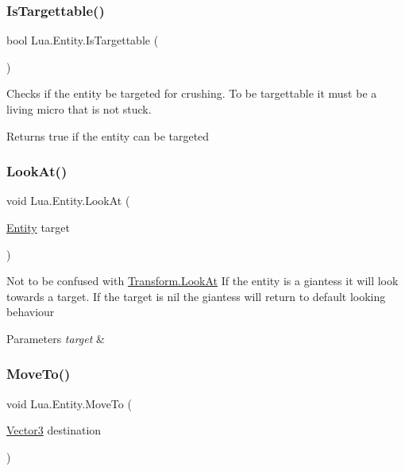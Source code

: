 \subsubsection{\texorpdfstring{IsTargettable()}{IsTargettable()}}
{\footnotesize\ttfamily bool Lua.\+Entity.\+Is\+Targettable (\begin{DoxyParamCaption}{ }\end{DoxyParamCaption})}



Checks if the entity be targeted for crushing. To be targettable it must be a living micro that is not stuck. 

\begin{DoxyReturn}{Returns}
true if the entity can be targeted
\end{DoxyReturn}
\mbox{\label{class_lua_1_1_entity_a29cdb052c5422873a708c8080039cb4b}} 
\subsubsection{\texorpdfstring{LookAt()}{LookAt()}}
{\footnotesize\ttfamily void Lua.\+Entity.\+Look\+At (\begin{DoxyParamCaption}\item[{\mbox{\hyperlink{class_lua_1_1_entity}{Entity}}}]{target }\end{DoxyParamCaption})}



Not to be confused with \mbox{\hyperlink{class_lua_1_1_transform_a1e722de9c3eacff82477ab7684a67553}{Transform.\+Look\+At}} If the entity is a giantess it will look towards a target. If the target is nil the giantess will return to default looking behaviour 


\begin{DoxyParams}{Parameters}
{\em target} & \\
\hline
\end{DoxyParams}
\mbox{\label{class_lua_1_1_entity_a5d6cfb68967adf948db2b6c09d7dfd38}} 
\subsubsection{\texorpdfstring{MoveTo()}{MoveTo()}\hspace{0.1cm}{\footnotesize\ttfamily [1/2]}}
{\footnotesize\ttfamily void Lua.\+Entity.\+Move\+To (\begin{DoxyParamCaption}\item[{\mbox{\hyperlink{class_lua_1_1_vector3}{Vector3}}}]{destination }\end{DoxyParamCaption})}




